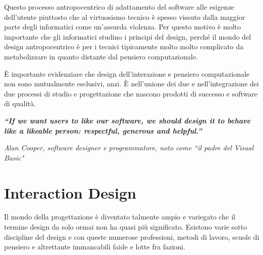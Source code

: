  
Questo processo antropocentrico di adattamento del software alle esigenze dell'utente piuttosto che al virtuosismo tecnico è spesso vissuto dalla maggior
parte degli informatici come un'assurda violenza. Per questo motivo è molto importante che gli informatici studino i principi del design, perché il mondo
del design antropocentrico è per i tecnici tipicamente molto molto complicato da metabolizzare in quanto distante dal pensiero computazionale.

\`E importante evidenziare che design dell'interazione e pensiero computazionale non sono mutualmente esclusivi, anzi. \`E nell'unione dei due e
nell'integrazione dei due processi di studio e progettazione che nascono prodotti di successo e software di qualità.
\vspace{\baselineskip}


\begin{flushleft}
\textbf{ \textit{``If we want users to like our software, we should design it to behave like a likeable person: respectful, generous and helpful.''}}

\textit{Alan Cooper, software designer e programmatore, noto come ``il padre del Visual Basic"}
    
\end{flushleft}


\section{Interaction Design}
Il mondo della progettazione è diventato talmente ampio e variegato che il termine design da solo ormai non ha quasi più significato. Esistono varie sotto
discipline del design e con queste numerose professioni, metodi di lavoro, scuole di pensiero e altrettante immancabili faide e lotte fra fazioni.

